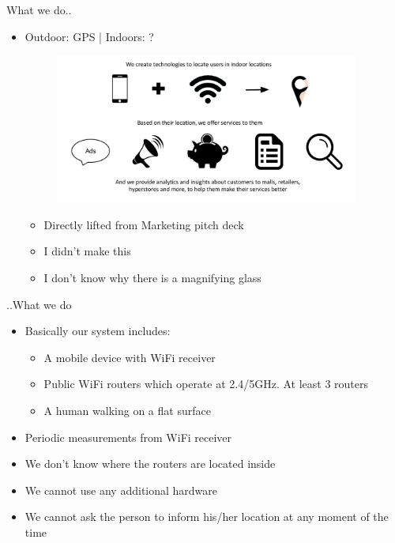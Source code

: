 \documentclass{beamer}
\begin{document}
\begin{frame}{What we do..}
\begin{itemize}
  \item Outdoor: GPS  | Indoors: ?
  \begin{figure} [ht!]
    \includegraphics[width=100mm]{images/marketing_pitch.png}
  \end{figure}
  \begin{itemize}
    \item Directly lifted from Marketing pitch deck
    \item I didn't make this
    \item I don't know why there is a magnifying glass
   \end{itemize}
\end{itemize}
\vskip 1cm
\end{frame}
\begin{frame}{..What we do}
\begin{itemize}
  \item Basically our system includes:
  \begin{itemize}
    \item A mobile device with WiFi receiver
    \item Public WiFi routers which operate at 2.4/5GHz. At least 3 routers
    \item A human walking on a flat surface
  \end{itemize}
  \item Periodic measurements from WiFi receiver
  \item We don't know where the routers are located inside
  \item We cannot use any additional hardware
  \item We cannot ask the person to inform his/her location at any moment of the time
\end{itemize}
\vskip 1cm
\end{frame}
\end{document}
